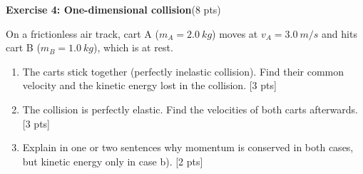 \documentclass[11pt,a4paper]{article}
\newcommand{\exercise}[3]{\bigskip\par\noindent\textbf{Exercise #1: #2}\hfill(#3 pts)\par\nopagebreak\smallskip}
\newcommand{\pts}[1]{\hfill[#1 pts]}
\begin{document}
\exercise{4}{One-dimensional collision}{8}
On a frictionless air track, cart A ($m_A = \qty{2.0}{kg}$) moves at $v_A = \qty{3.0}{m/s}$ and hits
cart B ($m_B = \qty{1.0}{kg}$), which is at rest.
\begin{enumerate}
  \item The carts stick together (perfectly inelastic collision). Find their common velocity and the
        kinetic energy lost in the collision. \pts{3}
  \item The collision is perfectly elastic. Find the velocities of both carts afterwards. \pts{3}
  \item Explain in one or two sentences why momentum is conserved in both cases, but kinetic energy only
        in case b). \pts{2}
\end{enumerate}
\end{document}
